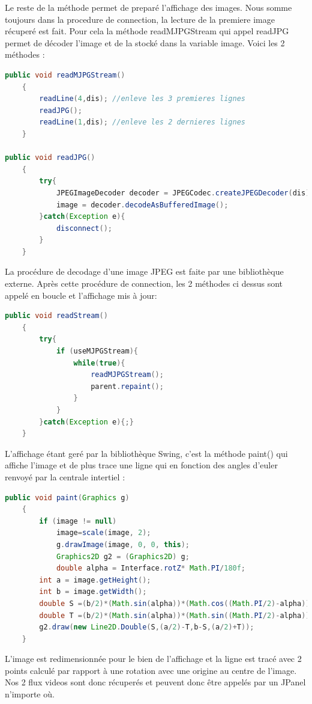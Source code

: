 \documentclass[a4paper,11pt]{report}
\begin{document}
		\newline Le reste de la méthode permet de preparé l'affichage des images.
		\newline Nous somme toujours dans la procedure de connection, la lecture de la premiere image récuperé est fait. Pour cela la méthode readMJPGStream qui appel readJPG permet de décoder l'image et de la stocké dans la variable image. Voici les 2 méthodes :
		\begin{lstlisting}[language=java]
public void readMJPGStream()
	{
		readLine(4,dis); //enleve les 3 premieres lignes
		readJPG();
		readLine(1,dis); //enleve les 2 dernieres lignes
	}
	
public void readJPG()
	{
		try{
			JPEGImageDecoder decoder = JPEGCodec.createJPEGDecoder(dis);
			image = decoder.decodeAsBufferedImage();
		}catch(Exception e){
			disconnect();
		}
	}
		\end{lstlisting}
		La procédure de decodage d'une image JPEG est faite par une bibliothèque externe.
		\newpage Après cette procédure de connection, les 2 méthodes ci dessus sont appelé en boucle et l'affichage mis à jour:
		\begin{lstlisting}[language=java]
public void readStream()
	{
		try{
			if (useMJPGStream){
				while(true){
					readMJPGStream();
					parent.repaint();
				}
			}
    	}catch(Exception e){;}
    }
		\end{lstlisting}
		L'affichage étant geré par la bibliothèque Swing, c'est la méthode paint() qui affiche l'image et de plus trace une ligne qui en fonction des angles d'euler renvoyé par la centrale intertiel :
		\begin{lstlisting}[language=java]
public void paint(Graphics g)
	{
		if (image != null)
			image=scale(image, 2);
			g.drawImage(image, 0, 0, this);
			Graphics2D g2 = (Graphics2D) g;
			double alpha = Interface.rotZ* Math.PI/180f;
    	int a = image.getHeight();
    	int b = image.getWidth();
    	double S =(b/2)*(Math.sin(alpha))*(Math.cos((Math.PI/2)-alpha));
    	double T =(b/2)*(Math.sin(alpha))*(Math.sin((Math.PI/2)-alpha));
    	g2.draw(new Line2D.Double(S,(a/2)-T,b-S,(a/2)+T));
	}
		\end{lstlisting}
	L'image est redimensionnée pour le bien de l'affichage et la ligne est tracé avec 2 points calculé par rapport à une rotation avec une origine au centre de l'image.
	\newline \newline Nos 2 flux videos sont donc récuperés et peuvent donc être appelés par un JPanel n'importe où.
\end{document}
